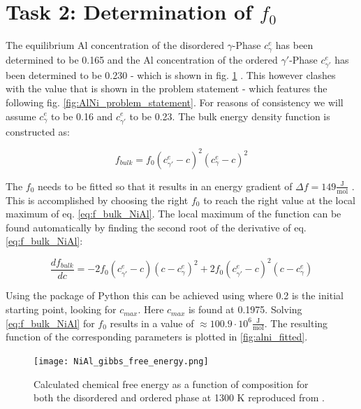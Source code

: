 \section{Task 2: Determination of \(f_{0}\)}
The equilibrium Al concentration of the disordered \(\gamma \)-Phase \(c_{\gamma}^{e}\) has been determined to be 0.165 and the  Al concentration of the ordered \(\gamma ' \)-Phase \(c_{\gamma '}^{e}\) has been determined to be 0.230 - which is shown in fig. \ref{fig:AlNi_gibbs} \cite{zhu2002}. This however clashes with the value that is shown in the problem statement \cite{zaisera} - which features the following fig. \ref{fig:AlNi_problem_statement}. For reasons of consistency we will assume \(c_{\gamma}^{e}\) to be 0.16 and \(c_{\gamma '}^{e}\) to be 0.23. The bulk energy density function is constructed as:

\begin{equation}
	f_{bulk} = f_{0} (c_{\gamma '}^{e} - c)^{2}(c_{\gamma}^{e} - c)^{2} \label{eq:f_bulk_NiAl}
\end{equation}

The \( f_{0}\) needs to be fitted so that it results in an energy gradient of \(\Delta f = 149 \frac{\mathrm{J}}{\mathrm{mol}} \) \cite{zaisera}. This is accomplished by choosing the right \(f_{0}\) to reach the right value at the local maximum of eq. \ref{eq:f_bulk_NiAl}. The local maximum of the function can be found automatically by finding the second root of the derivative of eq. \ref{eq:f_bulk_NiAl}:

\begin{equation}
	\frac{df_{bulk}}{dc} = -2 f_{0} (c_{\gamma '}^{e} - c)(c - c_{\gamma}^{e})^{2} + 2 f_{0} (c_{\gamma '}^{e} - c)^{2}(c - c_{\gamma}^{e})
\end{equation}

Using the  package of Python this can be achieved using  where 0.2 is the initial starting point, looking for \(c_{max}\). Here \(c_{max}\) is found at 0.1975. Solving \ref{eq:f_bulk_NiAl} for \(f_{0}\) results in a value of \(\approx 100.9 \cdot 10^{6} \frac{\mathrm{J}}{\mathrm{mol}}\).  The resulting function of the corresponding parameters is plotted in \ref{fig:alni_fitted}.


\begin{figure}[htb]
	\centering\texttt{[image: NiAl\_gibbs\_free\_energy.png]}
	\caption{Calculated chemical free energy as a function of composition for both the disordered and ordered phase at 1300 K reproduced from \cite{zhu2002}.}
	\label{fig:AlNi_gibbs}
\end{figure}

